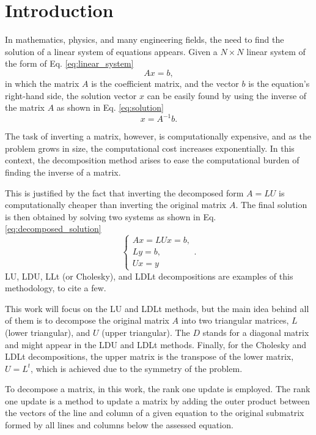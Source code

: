 \section{Introduction} \label{sec:introduction}
In mathematics, physics, and many engineering fields, the need to find the solution of a linear system of equations appears. Given a $N\times N$ linear system of the form of Eq. \eqref{eq:linear_system}
\begin{equation}
    Ax = b,
    \label{eq:linear_system}
\end{equation}
in which the matrix $A$ is the coefficient matrix, and the vector $b$ is the equation's right-hand side, the solution vector $x$ can be easily found by using the inverse of the matrix $A$ as shown in Eq. \eqref{eq:solution}
\begin{equation}
    x = A^{-1}b.
    \label{eq:solution}
\end{equation}

The task of inverting a matrix, however, is computationally expensive, and as the problem grows in size, the computational cost increases exponentially. In this context, the decomposition method arises to ease the computational burden of finding the inverse of a matrix. 

This is justified by the fact that inverting the decomposed form $A=LU$ is computationally cheaper than inverting the original matrix $A$. The final solution is then obtained by solving two systems as shown in Eq. \eqref{eq:decomposed_solution}
\begin{equation}
    \begin{cases}
        Ax = LUx = b, \\
        Ly = b, \\
        Ux = y
    \end{cases}.
    \label{eq:decomposed_solution}
\end{equation}
LU, LDU, LLt (or Cholesky), and LDLt decompositions are examples of this methodology, to cite a few. 

This work will focus on the LU and LDLt methods, but the main idea behind all of them is to decompose the original matrix $A$ into two triangular matrices, $L$ (lower triangular), and $U$ (upper triangular). The $D$ stands for a diagonal matrix and might appear in the LDU and LDLt methods. Finally, for the Cholesky and LDLt decompositions, the upper matrix is the transpose of the lower matrix, $U = L^t$, which is achieved due to the symmetry of the problem.

To decompose a matrix, in this work, the rank one update is employed. The rank one update is a method to update a matrix by adding the outer product between the vectors of the line and column of a given equation to the original submatrix formed by all lines and columns below the assessed equation. 

